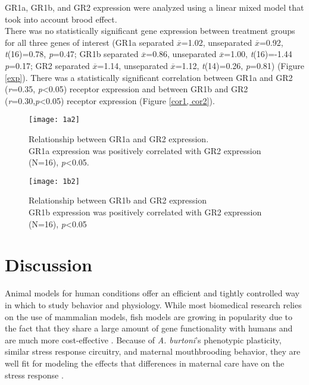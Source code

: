 \documentclass[12pt,twoside]{reedthesis}
\begin{document}
GR1a, GR1b, and GR2 expression were analyzed using a linear mixed model that
took into account brood effect. \\
There was no statistically significant gene expression between treatment groups
for all three genes of interest (GR1a separated $\overline{x}$=1.02, unseparated
$\overline{x}$=0.92, \textit{t}(16)=0.78, \textit{p}=0.47; GR1b separated
$\overline{x}$=0.86, unseparated $\overline{x}$=1.00, \textit{t}(16)=-1.44 \textit{p}=0.17; GR2 separated $\overline{x}$=1.14,
unseparated $\overline{x}$=1.12, \textit{t}(14)=0.26, \textit{p}=0.81) (Figure \ref{exp}). There was a statistically significant
correlation between GR1a and GR2 (\textit{r}=0.35, \textit{p}<0.05) receptor
expression and between GR1b and GR2
(\textit{r}=0.30,\textit{p}<0.05) receptor expression (Figure \ref{cor1, cor2}).

\begin{figure}[htbp] 
\begin{center} 
\texttt{[image: 1a2]}
\caption[Relationship between GR1a and GR2
expression]{\footnotesize{Relationship between GR1a and GR2 expression.\\ GR1a
    expression was positively correlated with GR2 expression (N=16), \textit{p}<0.05.}}
\label{cor1}
\end{center} 
\end{figure}

\begin{figure}[htbp] 
\begin{center} 
\texttt{[image: 1b2]}
\caption[Relationship between GR1b and GR2
expression]{\footnotesize{Relationship between GR1b and GR2 expression\\ GR1b
    expression was positively correlated with GR2 expression (N=16), \textit{p}<0.05}}
\label{cor2}
\end{center} 
\end{figure}


\chapter{Discussion}

Animal models for human conditions offer an efficient and tightly controlled way
in which to study behavior and physiology. While most biomedical research
relies on the use of mammalian models, fish models are growing in popularity due to
the fact that they share a large amount of gene
functionality with humans and are much more cost-effective
\citep{cech_cellular_2011}. 
Because of \textit{A. burtoni}'s phenotypic plasticity, similar stress
response circuitry, and maternal
mouthbrooding behavior, they are well fit for modeling the effects that
differences in maternal care have on the stress response
\citep{greenwood_multiple_2003, pijanowski_activity_2015, renn_fish_2008}.
\end{document}

